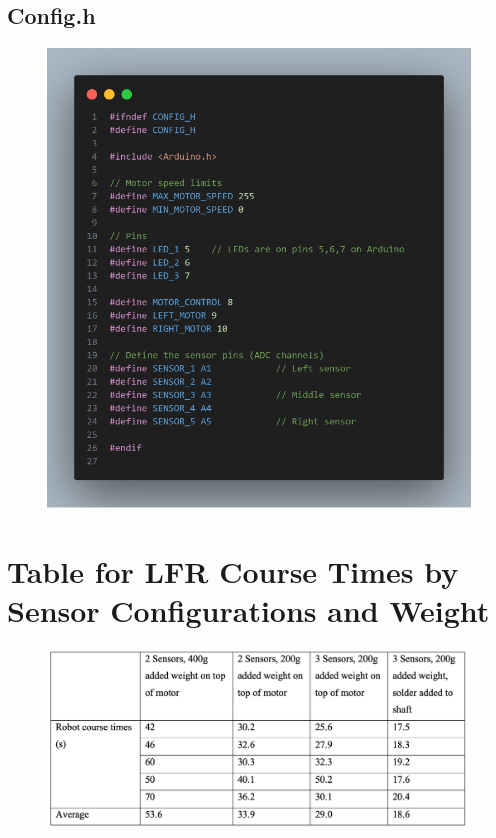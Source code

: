 \documentclass{article}
\begin{document}
\subsection{Config.h}

\begin{figure}[H]
    \centering
    \includegraphics[width=0.8\linewidth]{REPORT/configcode.png}
\end{figure}

\section{Table for LFR Course Times by Sensor Configurations and Weight}
\begin{figure}[H]
    \centering
    \includegraphics[width=0.8\linewidth]{REPORT/Screenshot 2024-10-20 at 3.11.46 AM.png}
\end{figure}
\end{document}
